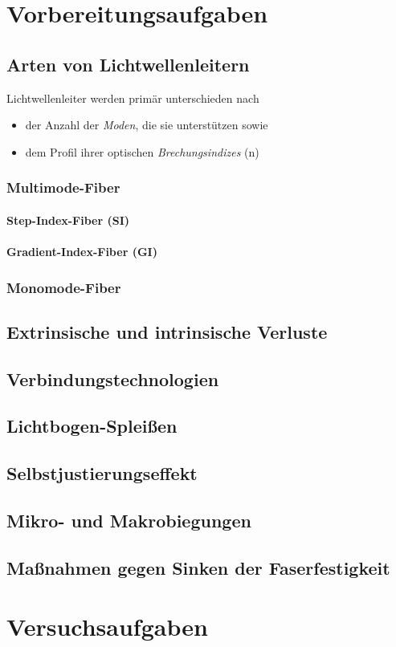 \documentclass[11pt, a4paper]{article}
\begin{document}

\clearpage
\setcounter{page}{1}

\section{Vorbereitungsaufgaben}

\subsection{Arten von Lichtwellenleitern}

Lichtwellenleiter werden primär unterschieden nach
\begin{itemize}
  \item der Anzahl der \emph{Moden}, die sie unterstützen sowie
  \item dem Profil ihrer optischen \emph{Brechungsindizes} (n)
\end{itemize}

\subsubsection{Multimode-Fiber}

\paragraph{Step-Index-Fiber (SI)}
\paragraph{Gradient-Index-Fiber (GI)}

\subsubsection{Monomode-Fiber}

\subsection{Extrinsische und intrinsische Verluste}

\subsection{Verbindungstechnologien}

\subsection{Lichtbogen-Spleißen}

\subsection{Selbstjustierungseffekt}

\subsection{Mikro- und Makrobiegungen}

\subsection{Maßnahmen gegen Sinken der Faserfestigkeit}

\section{Versuchsaufgaben}

\end{document}
